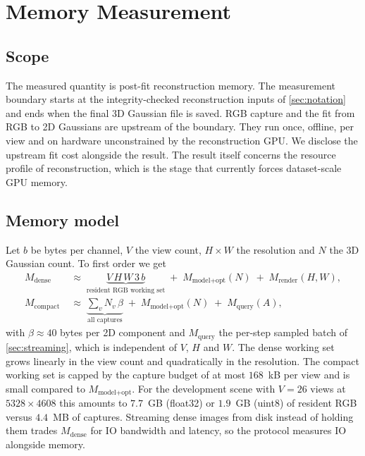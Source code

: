 \section{Memory Measurement}
\label{sec:memory}

\subsection{Scope}
\label{sec:memory-scope}

The measured quantity is post-fit reconstruction memory.  The measurement boundary starts
at the integrity-checked reconstruction inputs of \cref{sec:notation} and ends when the
final 3D Gaussian file is saved.  RGB capture and the fit from RGB to 2D Gaussians are
upstream of the boundary.  They run once, offline, per view and on hardware unconstrained
by the reconstruction GPU.  We disclose the upstream fit cost alongside the result.
  The result itself concerns the resource profile of reconstruction, which is the
stage that currently forces dataset-scale GPU memory.

\subsection{Memory model}
\label{sec:memory-model}

Let $b$ be bytes per channel, $V$ the view count, $H \times W$ the resolution and $N$ the
3D Gaussian count.  To first order we get
\begin{align}
  M_{\text{dense}} &\;\approx\; \underbrace{V \, H \, W \, 3\, b}_{\text{resident RGB working set}}
    \;+\; M_{\text{model+opt}}(N) \;+\; M_{\text{render}}(H, W),
  \label{eq:mem-dense}\\[2pt]
  M_{\text{compact}} &\;\approx\; \underbrace{\textstyle\sum_{v} N_v \, \beta}_{\text{all captures}}
    \;+\; M_{\text{model+opt}}(N) \;+\; M_{\text{query}}(A),
  \label{eq:mem-compact}
\end{align}
with $\beta \approx 40$ bytes per 2D component and $M_{\text{query}}$ the per-step sampled
batch of \cref{sec:streaming}, which is independent of $V$, $H$ and $W$.  The dense
working set grows linearly in the view count and quadratically in the resolution.  The
compact working set is capped by the capture budget of at most $168$~kB per view and is
small compared to $M_{\text{model+opt}}$.  For the development scene with $V{=}26$ views
at $5328 \times 4608$ this amounts to $7.7$~GB (float32) or $1.9$~GB (uint8) of resident
RGB versus $4.4$~MB of captures.  Streaming dense images from disk instead of holding them
trades $M_{\text{dense}}$ for IO bandwidth and latency, so the protocol measures IO
alongside memory.

